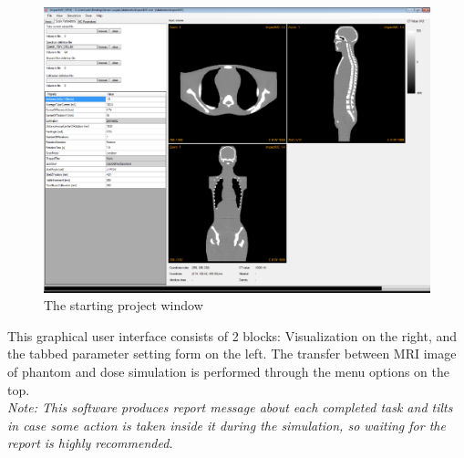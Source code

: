\documentclass[fleqn,10pt]{SelfArx} %
\begin{document}
\begin{figure}[ht]\centering
\includegraphics[width=\linewidth]{startingImage}
\caption{The starting project window}
\label{fig:startingImage}
\end{figure}
This graphical user interface consists of 2 blocks: Visualization on the right, and the tabbed parameter setting form on the left. The transfer between MRI image of phantom and dose simulation is performed through the menu options on the top.\\
 \textit{Note: This software produces report message about each completed task and tilts in case some action is taken inside it during the simulation, so waiting for the report is highly recommended.}


\end{document}
